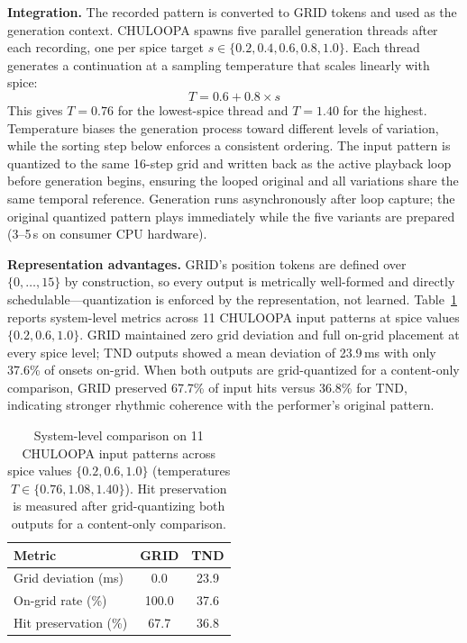 \documentclass{article}
\begin{document}
\textbf{Integration.} The recorded pattern is converted to GRID tokens and used as the generation context. CHULOOPA spawns five parallel generation threads after each recording, one per spice target $s \in \{0.2, 0.4, 0.6, 0.8, 1.0\}$. Each thread generates a continuation at a sampling temperature that scales linearly with spice:
\begin{equation}
  T = 0.6 + 0.8 \times s
\end{equation}
This gives $T{=}0.76$ for the lowest-spice thread and $T{=}1.40$ for the highest. Temperature biases the generation process toward different levels of variation, while the sorting step below enforces a consistent ordering. The input pattern is quantized to the same 16-step grid and written back as the active playback loop before generation begins, ensuring the looped original and all variations share the same temporal reference. Generation runs asynchronously after loop capture; the original quantized pattern plays immediately while the five variants are prepared (3--5\,s on consumer CPU hardware).


\textbf{Representation advantages.} GRID's position tokens are defined over $\{0,\dots,15\}$ by construction, so every output is metrically well-formed and directly schedulable---quantization is enforced by the representation, not learned. Table~\ref{tab:chuloopa_comparison} reports system-level metrics across 11 CHULOOPA input patterns at spice values $\{0.2, 0.6, 1.0\}$. GRID maintained zero grid deviation and full on-grid placement at every spice level; TND outputs showed a mean deviation of 23.9\,ms with only 37.6\% of onsets on-grid. When both outputs are grid-quantized for a content-only comparison, GRID preserved 67.7\% of input hits versus 36.8\% for TND, indicating stronger rhythmic coherence with the performer's original pattern.

\begin{table}[t]
\centering
\small
\setlength{\tabcolsep}{6pt}
\begin{tabular}{lcc}
\toprule
Metric & GRID & TND \\
\midrule
Grid deviation (ms) & 0.0 & 23.9 \\
On-grid rate (\%) & 100.0 & 37.6 \\
Hit preservation (\%) & 67.7 & 36.8 \\
\bottomrule
\end{tabular}
\caption{System-level comparison on 11 CHULOOPA input patterns across spice values $\{0.2, 0.6, 1.0\}$ (temperatures $T \in \{0.76, 1.08, 1.40\}$). Hit preservation is measured after grid-quantizing both outputs for a content-only comparison.}
\label{tab:chuloopa_comparison}
\end{table}
\end{document}

